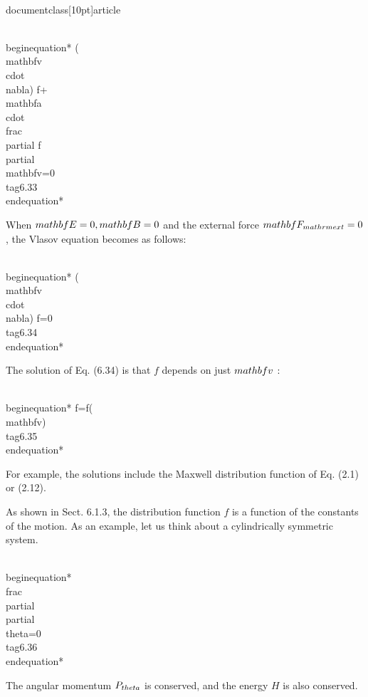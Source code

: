 \\documentclass[10pt]{article}
\begin{document}
{{{{\\begin{equation*}
(\\mathbf{v} \\cdot \\nabla) f+\\mathbf{a} \\cdot \\frac{\\partial f}{\\partial \\mathbf{v}}=0 \\tag{6.33}
\\end{equation*}


When $\\mathbf{E}=0, \\mathbf{B}=0$ and the external force $\\mathbf{F}_{\\mathrm{ext}}=0$, the Vlasov equation becomes as follows:


\\begin{equation*}
(\\mathbf{v} \\cdot \\nabla) f=0 \\tag{6.34}
\\end{equation*}


The solution of Eq. (6.34) is that $f$ depends on just $\\mathbf{v}$ :


\\begin{equation*}
f=f(\\mathbf{v}) \\tag{6.35}
\\end{equation*}


For example, the solutions include the Maxwell distribution function of Eq. (2.1) or (2.12).

As shown in Sect. 6.1.3, the distribution function $f$ is a function of the constants of the motion. As an example, let us think about a cylindrically symmetric system.


\\begin{equation*}
\\frac{\\partial}{\\partial \\theta}=0 \\tag{6.36}
\\end{equation*}


The angular momentum $P_{\\theta}$ is conserved, and the energy $H$ is also conserved.


}}}}
\end{document}

